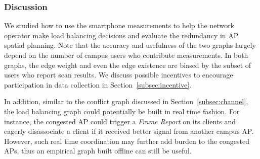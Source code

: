 \subsubsection{Discussion}

We studied how to use the smartphone measurements to help the network operator
make load balancing decisions and evaluate the redundancy in AP spatial
planning. Note that the accuracy and usefulness of the two graphs largely depend
on the number of campus \wifi{} users who contribute measurements. In both
graphs, the edge weight and even the edge existence are biased by the subset of
users who report scan results. We discuss possible incentives to encourage
participation in data collection in Section~\ref{subsec:incentive}.

In addition, similar to the conflict graph discussed in
Section~\ref{subsec:channel}, the load balancing graph could potentially be built
in real time fashion. For instance, the congested AP could trigger a \textit{Frame
Report} on its clients and eagerly disassociate a client if it received better
signal from another campus AP. However, such real time coordination may further
add burden to the congested APs, thus an empirical graph built offline can still
be useful.
